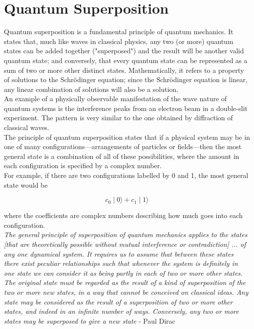 \documentclass[11pt]{article}
\begin{document}
\section{Quantum Superposition}
Quantum superposition is a fundamental principle of quantum mechanics. It states that, much like waves in classical physics, any two (or more) quantum states can be added together ("superposed") and the result will be another valid quantum state; and conversely, that every quantum state can be represented as a sum of two or more other distinct states. Mathematically, it refers to a property of solutions to the Schrödinger equation; since the Schrödinger equation is linear, any linear combination of solutions will also be a solution.\\

An example of a physically observable manifestation of the wave nature of quantum systems is the interference peaks from an electron beam in a double-slit experiment. The pattern is very similar to the one obtained by diffraction of classical waves.\\

The principle of quantum superposition states that if a physical system may be in one of many configurations—arrangements of particles or fields—then the most general state is a combination of all of these possibilities, where the amount in each configuration is specified by a complex number.\\

For example, if there are two configurations labelled by 0 and 1, the most general state would be

$${\displaystyle c_{0}{\mid }0\rangle +c_{1}{\mid }1\rangle }$$

where the coefficients are complex numbers describing how much goes into each configuration.\\


\textit{The general principle of superposition of quantum mechanics applies to the states [that are theoretically possible without mutual interference or contradiction] ... of any one dynamical system. It requires us to assume that between these states there exist peculiar relationships such that whenever the system is definitely in one state we can consider it as being partly in each of two or more other states. The original state must be regarded as the result of a kind of superposition of the two or more new states, in a way that cannot be conceived on classical ideas. Any state may be considered as the result of a superposition of two or more other states, and indeed in an 
infinite number of ways. Conversely, any two or more states may be superposed to give a new state} - Paul Dirac
\end{document}
